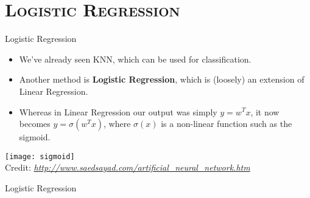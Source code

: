 \section{\scshape Logistic Regression}
\begin{frame}{Logistic Regression}
	\begin{itemize}
		\item We've already seen KNN, which can be used for classification.
		\item Another method is \textbf{Logistic Regression}, which is (loosely) an extension of Linear Regression.
		\item Whereas in Linear Regression our output was simply $y = w^Tx$, it now becomes $y = \sigma\left(w^Tx\right)$, where $\sigma(x)$ is a non-linear function such as the sigmoid.
	\end{itemize}
	\begin{center}
		\texttt{[image: sigmoid]}\\[-1ex]
		{\tiny Credit: {\itshape \url{http://www.saedsayad.com/artificial_neural_network.htm}}}
	\end{center}
\end{frame}

\begin{frame}{Logistic Regression}
	\begin{center}
	\end{center}
\end{frame}



